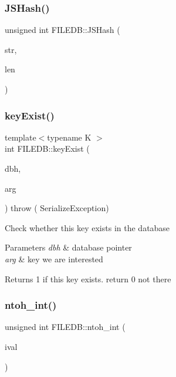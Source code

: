 \subsubsection{\texorpdfstring{JSHash()}{JSHash()}}
{\footnotesize\ttfamily unsigned int F\+I\+L\+E\+D\+B\+::\+J\+S\+Hash (\begin{DoxyParamCaption}\item[{char $\ast$}]{str,  }\item[{unsigned int}]{len }\end{DoxyParamCaption})}

\mbox{\label{namespaceFILEDB_a693e2659d01ea18edb88d796d7cbd5de}} 
\subsubsection{\texorpdfstring{keyExist()}{keyExist()}}
{\footnotesize\ttfamily template$<$typename K $>$ \\
int F\+I\+L\+E\+D\+B\+::key\+Exist (\begin{DoxyParamCaption}\item[{\mbox{\hyperlink{other__libs_2filedb_2filehash_2ffdb__db_8h_a0b27b956926453a7a8141ea8e10f0df8}{F\+F\+D\+B\+\_\+\+DB}} $\ast$}]{dbh,  }\item[{const K \&}]{arg }\end{DoxyParamCaption}) throw ( Serialize\+Exception) }

Check whether this key exists in the database


\begin{DoxyParams}{Parameters}
{\em dbh} & database pointer \\
\hline
{\em arg} & key we are interested\\
\hline
\end{DoxyParams}
\begin{DoxyReturn}{Returns}
1 if this key exists. return 0 not there 
\end{DoxyReturn}
\mbox{\label{namespaceFILEDB_ab34ff6954f1b3a0dc868119d34105579}} 
\subsubsection{\texorpdfstring{ntoh\_int()}{ntoh\_int()}}
{\footnotesize\ttfamily unsigned int F\+I\+L\+E\+D\+B\+::ntoh\+\_\+int (\begin{DoxyParamCaption}\item[{unsigned int}]{ival }\end{DoxyParamCaption})}

